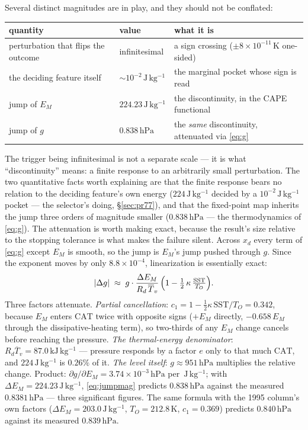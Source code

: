 \documentclass[11pt,a4paper]{article}
\theoremstyle{definition}
\newcommand{\hPa}{\,\mathrm{hPa}}
\newcommand{\Jkg}{\,\mathrm{J\,kg^{-1}}}
\newcommand{\K}{\,\mathrm{K}}
\begin{document}
Several distinct magnitudes are in play, and they should not be conflated:

\begin{center}
\small
\begin{tabular}{@{}lll@{}}
\toprule
quantity & value & what it is\\
\midrule
perturbation that flips the outcome & infinitesimal & a sign crossing
($\pm8\times10^{-11}\K$ one-sided)\\
the deciding feature itself & $\sim10^{-2}\Jkg$ & the marginal pocket
whose sign is read\\
jump of $E_M$ & $224.23\Jkg$ & the discontinuity, in the CAPE
functional\\
jump of $g$ & $0.838\hPa$ & the \emph{same} discontinuity, attenuated
via \eqref{eq:g}\\
\bottomrule
\end{tabular}
\end{center}

\noindent
The trigger being infinitesimal is not a separate scale --- it is what
``discontinuity'' means: a finite response to an arbitrarily small
perturbation.  The two quantitative facts worth explaining are that the
finite response bears no relation to the deciding feature's own energy
($224\Jkg$ decided by a $10^{-2}\Jkg$ pocket --- the selector's doing,
\S\ref{sec:pr77}), and that the fixed-point map inherits the jump three
orders of magnitude smaller ($0.838\hPa$ --- the thermodynamics of
\eqref{eq:g}).  The attenuation is worth making exact, because the
result's size relative to the stopping tolerance is what makes the failure
silent.  Across $x_d$ every term of \eqref{eq:g} except $E_M$ is smooth, so
the jump is $E_M$'s jump pushed through $g$.  Since the exponent moves by
only $8.8\times10^{-4}$, linearization is essentially exact:
\begin{equation}\label{eq:jumpmag}
|\Delta g| \;\approx\; g\cdot\frac{\Delta E_M}{R_d\,\overline T_v}
\,\Bigl(1-\tfrac12\,\kappa\,\tfrac{\mathrm{SST}}{T_O}\Bigr).
\end{equation}
Three factors attenuate.  \emph{Partial cancellation}:
$c_1=1-\tfrac12\kappa\,\mathrm{SST}/T_O=0.342$, because $E_M$ enters
$\mathrm{CAT}$ twice with opposite signs ($+E_M$ directly, $-0.658\,E_M$
through the dissipative-heating term), so two-thirds of any $E_M$ change
cancels before reaching the pressure.  \emph{The thermal-energy
denominator}: $R_d\overline T_v=87.0\,\mathrm{kJ\,kg^{-1}}$ --- pressure
responds by a factor $e$ only to that much $\mathrm{CAT}$, and $224\Jkg$ is
$0.26\%$ of it.  \emph{The level itself}: $g\approx951\hPa$ multiplies the
relative change.  Product: $\partial g/\partial E_M=3.74\times10^{-3}\hPa$
per $\Jkg$; with $\Delta E_M=224.23\Jkg$, \eqref{eq:jumpmag} predicts
$0.838\hPa$ against the measured $0.8381\hPa$ --- three significant
figures.  The same formula with the 1995 column's own factors
($\Delta E_M=203.0\Jkg$, $T_O=212.8\K$, $c_1=0.369$) predicts $0.840\hPa$
against its measured $0.839\hPa$.
\end{document}
